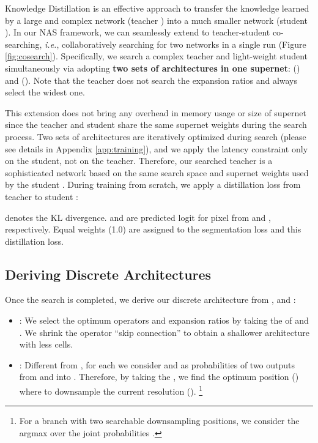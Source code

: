 \documentclass{article} \usepackage{iclr2020_conference,times}
\begin{document}
Knowledge Distillation is an effective approach to transfer the knowledge learned by a large and complex network (teacher ) into a much smaller network (student ). In our NAS framework, we can seamlessly extend to teacher-student co-searching, \textit{i.e.}, collaboratively searching for two networks in a single run (Figure \ref{fig:cosearch}). Specifically, we search a complex teacher and light-weight student simultaneously via adopting \textbf{two sets of architectures in one supernet}: ()
and ().
Note that the teacher does not search the expansion ratios and always select the widest one.

This extension does not bring any overhead in memory usage or size of supernet since the teacher and student share the same supernet weights  during the search process. Two sets of architectures are iteratively optimized during search (please see details in Appendix \ref{app:training}), and we apply the latency constraint only on the student, not on the teacher. Therefore, our searched teacher is a sophisticated network based on the same search space and supernet weights  used by the student
.
During training from scratch, we apply a distillation loss from teacher  to student :\vspace{-0.5em}

 denotes the KL divergence.  and  are predicted logit for pixel  from  and , respectively. Equal weights (1.0) are assigned to the segmentation loss and this distillation loss.



\subsection{Deriving Discrete Architectures}\label{sec:decoding}
Once the search is completed, we derive our discrete architecture from , and :

\begin{itemize}[leftmargin=*]
    \vspace{-1em}
    \item \textbf{}: We select the optimum operators and expansion ratios by taking the  of  and . We shrink the operator ``skip connection'' to obtain a shallower architecture with less cells.
    \item \textbf{}: Different from \citep{liu2019auto}, for each  we consider  and  as probabilities of two outputs from  and  into . Therefore, by taking the ,
we find the optimum position () where to downsample the current resolution (). \footnote{For a branch with two searchable downsampling positions, we consider the argmax over the joint probabilities .} \vspace{-0.5em}
\end{itemize}
\end{document}
